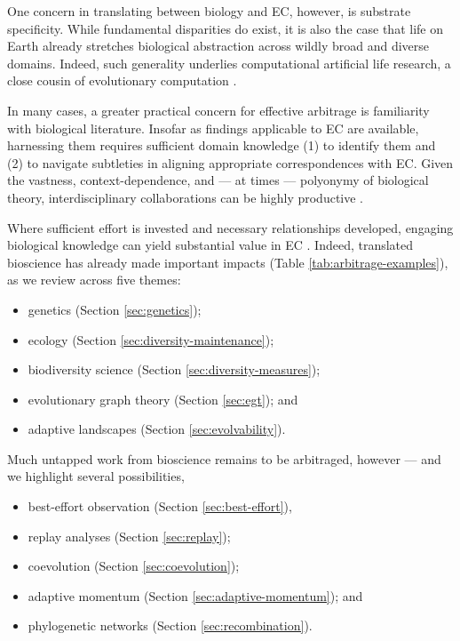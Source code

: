 One concern in translating between biology and EC, however, is substrate specificity.
While fundamental disparities do exist, it is also the case that life on Earth already stretches biological abstraction across wildly broad and diverse domains.
Indeed, such generality underlies computational artificial life research, a close cousin of evolutionary computation \citep{cleland2012general,langton1989artificial,pennock2007models}. %

In many cases, a greater practical concern for effective arbitrage is familiarity with biological literature.
Insofar as findings applicable to EC are available, harnessing them requires sufficient domain knowledge (1) to identify them and (2) to navigate subtleties in aligning appropriate correspondences with EC.
Given the vastness, context-dependence, and --- at times --- polyonymy of biological theory, interdisciplinary collaborations can be highly productive \citep{goodman2020evolution}.

Where sufficient effort is invested and necessary relationships developed, engaging biological knowledge can yield substantial value in EC \citep{hu2010evolvability,dolson2018ecological,paixao2015toward,wagner1996perspective}.
Indeed, translated bioscience has already made important impacts (Table \ref{tab:arbitrage-examples}), as we review across five themes:
\begin{itemize}
  \item genetics (Section \ref{sec:genetics});
  \item ecology (Section \ref{sec:diversity-maintenance});
  \item biodiversity science (Section \ref{sec:diversity-measures});
  \item evolutionary graph theory (Section \ref{sec:egt}); and
  \item adaptive landscapes (Section \ref{sec:evolvability}).
\end{itemize}

Much untapped work from bioscience remains to be arbitraged, however --- and we highlight several possibilities,
\begin{itemize}
  \item best-effort observation (Section \ref{sec:best-effort}),
  \item replay analyses (Section \ref{sec:replay});
  \item coevolution (Section \ref{sec:coevolution});
  \item adaptive momentum (Section \ref{sec:adaptive-momentum}); and
  \item phylogenetic networks (Section \ref{sec:recombination}).
\end{itemize}

